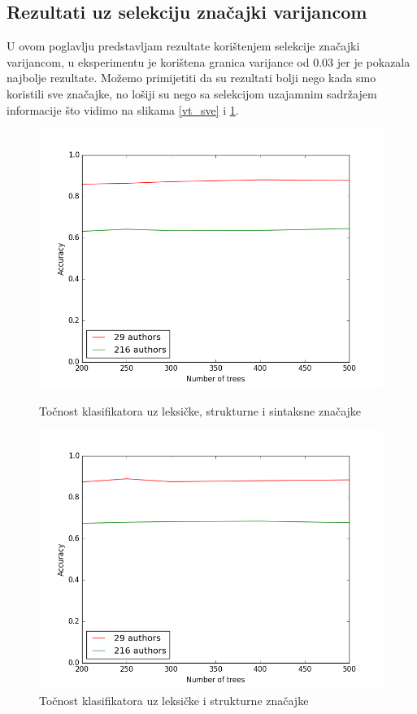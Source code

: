 \subsection{Rezultati uz selekciju značajki varijancom}

U ovom poglavlju predstavljam rezultate korištenjem selekcije značajki varijancom, u eksperimentu je korištena granica varijance od $0.03$ jer je pokazala najbolje rezultate. Možemo primijetiti da su rezultati bolji nego kada smo koristili sve značajke, no lošiji su nego sa selekcijom uzajamnim sadržajem informacije što vidimo na slikama \ref{vt_sve} i \ref{vt_leksicke}.

\begin{figure}[H]
  \centering
  \begin{minipage}[b]{0.49\textwidth}
    \includegraphics[width=\textwidth]{fig/vt_sve.png}
    \caption{Točnost klasifikatora uz leksičke, strukturne i sintaksne značajke}
    \label{vt_sve}
  \end{minipage}
  \hfill
  \begin{minipage}[b]{0.49\textwidth}
    \includegraphics[width=\textwidth]{fig/leksicke_vt.png}
    \caption{Točnost klasifikatora uz leksičke i strukturne značajke}
    \label{vt_leksicke}
  \end{minipage}
\end{figure}

